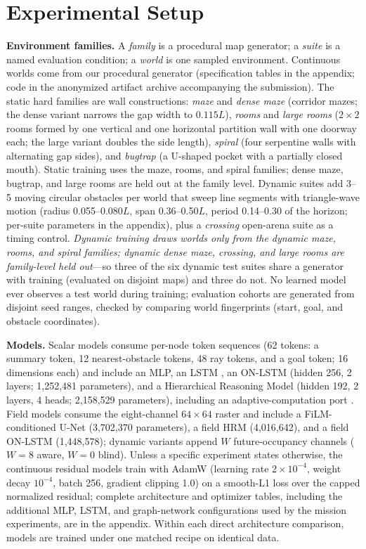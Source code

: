 \documentclass[letterpaper]{article} %
\begin{document}
\section{Experimental Setup}

\textbf{Environment families.} A \emph{family} is a procedural map generator; a \emph{suite} is a named evaluation condition; a \emph{world} is one sampled environment. Continuous worlds come from our procedural generator (specification tables in the appendix; code in the anonymized artifact archive accompanying the submission). The static hard families are wall constructions: \emph{maze} and \emph{dense maze} (corridor mazes; the dense variant narrows the gap width to $0.115L$), \emph{rooms} and \emph{large rooms} ($2{\times}2$ rooms formed by one vertical and one horizontal partition wall with one doorway each; the large variant doubles the side length), \emph{spiral} (four serpentine walls with alternating gap sides), and \emph{bugtrap} (a U-shaped pocket with a partially closed mouth). Static training uses the maze, rooms, and spiral families; dense maze, bugtrap, and large rooms are held out at the family level. Dynamic suites add 3--5 moving circular obstacles per world that sweep line segments with triangle-wave motion (radius 0.055--0.080$L$, span 0.36--0.50$L$, period 0.14--0.30 of the horizon; per-suite parameters in the appendix), plus a \emph{crossing} open-arena suite as a timing control. \emph{Dynamic training draws worlds only from the dynamic maze, rooms, and spiral families; dynamic dense maze, crossing, and large rooms are family-level held out}---so three of the six dynamic test suites share a generator with training (evaluated on disjoint maps) and three do not. No learned model ever observes a test world during training; evaluation cohorts are generated from disjoint seed ranges, checked by comparing world fingerprints (start, goal, and obstacle coordinates).

\textbf{Models.} Scalar models consume per-node token sequences (62 tokens: a summary token, 12 nearest-obstacle tokens, 48 ray tokens, and a goal token; 16 dimensions each) and include an MLP, an LSTM \citep{hochreiter1997lstm}, an ON-LSTM \citep{shen2019onlstm} (hidden 256, 2 layers; 1{,}252{,}481 parameters), and a Hierarchical Reasoning Model \citep[HRM;][]{wang2025hrm} (hidden 192, 2 layers, 4 heads; 2{,}158{,}529 parameters), including an adaptive-computation port \citep{graves2016act,banino2021pondernet}. Field models consume the eight-channel $64{\times}64$ raster and include a FiLM-conditioned U-Net \citep{ronneberger2015unet,perez2018film} (3{,}702{,}370 parameters), a field HRM (4{,}016{,}642), and a field ON-LSTM (1{,}448{,}578); dynamic variants append $W$ future-occupancy channels ($W{=}8$ aware, $W{=}0$ blind). Unless a specific experiment states otherwise, the continuous residual models train with AdamW (learning rate $2{\times}10^{-4}$, weight decay $10^{-4}$, batch 256, gradient clipping 1.0) on a smooth-L1 loss over the capped normalized residual; complete architecture and optimizer tables, including the additional MLP, LSTM, and graph-network configurations used by the mission experiments, are in the appendix. Within each direct architecture comparison, models are trained under one matched recipe on identical data.
\end{document}
